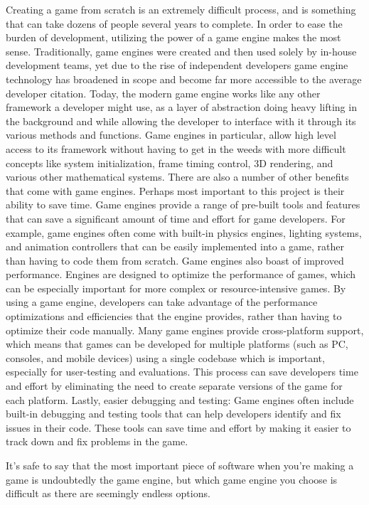 \documentclass[10pt,twocolumn]{article}
\begin{document}
Creating a game from scratch is an extremely difficult process, and is something that can take dozens of people several years to complete. In order to ease the burden of development, utilizing the power of a game engine makes the most sense. Traditionally, game engines were created and then used solely by in-house development teams, yet due to the rise of independent developers game engine technology has broadened in scope and become far more accessible to the average developer \cite{VentureUnity} citation. Today, the modern game engine works like any other framework a developer might use, as a layer of abstraction doing heavy lifting in the background and while allowing the developer to interface with it through its various methods and functions. Game engines in particular, allow high level access to its framework without having to get in the weeds with more difficult concepts like system initialization, frame timing control, 3D rendering, and various other mathematical systems. 
There are also a number of other benefits that come with game engines. Perhaps most important to this project is their ability to save time. Game engines provide a range of pre-built tools and features that can save a significant amount of time and effort for game developers. For example, game engines often come with built-in physics engines, lighting systems, and animation controllers that can be easily implemented into a game, rather than having to code them from scratch. Game engines also boast of improved performance. Engines are designed to optimize the performance of games, which can be especially important for more complex or resource-intensive games. By using a game engine, developers can take advantage of the performance optimizations and efficiencies that the engine provides, rather than having to optimize their code manually. Many game engines provide cross-platform support, which means that games can be developed for multiple platforms (such as PC, consoles, and mobile devices) using a single codebase which is important, especially for user-testing and evaluations. This process can save developers time and effort by eliminating the need to create separate versions of the game for each platform. Lastly, easier debugging and testing: Game engines often include built-in debugging and testing tools that can help developers identify and fix issues in their code. These tools can save time and effort by making it easier to track down and fix problems in the game. 

It’s safe to say that the most important piece of software when you’re making a game is undoubtedly the game engine, but which game engine you choose is difficult as there are seemingly endless options. 
\end{document}
